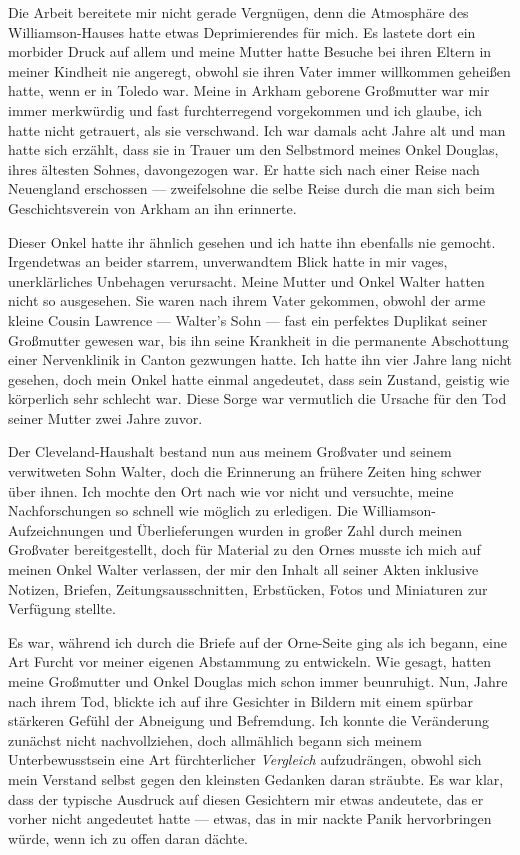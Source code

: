 Die Arbeit bereitete mir nicht gerade Vergnügen, denn die Atmosphäre des Williamson-Hauses hatte etwas Deprimierendes für mich. Es lastete dort ein morbider Druck auf allem und meine Mutter hatte Besuche bei ihren Eltern in meiner Kindheit nie angeregt, obwohl sie ihren Vater immer willkommen geheißen hatte, wenn er in Toledo war. Meine in Arkham geborene Großmutter war mir immer merkwürdig und fast furchterregend vorgekommen und ich glaube, ich hatte nicht getrauert, als sie verschwand. Ich war damals acht Jahre alt und man hatte sich erzählt, dass sie in Trauer um den Selbstmord meines Onkel Douglas, ihres ältesten Sohnes, davongezogen war. Er hatte sich nach einer Reise nach Neuengland erschossen --- zweifelsohne die selbe Reise durch die man sich beim Geschichtsverein von Arkham an ihn erinnerte.

Dieser Onkel hatte ihr ähnlich gesehen und ich hatte ihn ebenfalls nie gemocht. Irgendetwas an beider starrem, unverwandtem Blick hatte in mir vages, unerklärliches Unbehagen verursacht. Meine Mutter und Onkel Walter hatten nicht so ausgesehen. Sie waren nach ihrem Vater  gekommen, obwohl der arme kleine Cousin Lawrence --- Walter's Sohn --- fast ein perfektes Duplikat seiner Großmutter gewesen war, bis ihn seine Krankheit in die permanente Abschottung einer Nervenklinik in Canton gezwungen hatte. Ich hatte ihn vier Jahre lang nicht gesehen, doch mein Onkel hatte einmal angedeutet, dass sein Zustand, geistig wie körperlich sehr schlecht war. Diese Sorge war vermutlich die Ursache für den Tod seiner Mutter zwei Jahre zuvor.

Der Cleveland-Haushalt bestand nun aus meinem Großvater und seinem verwitweten Sohn Walter, doch die Erinnerung an frühere Zeiten hing schwer über ihnen. Ich mochte den Ort nach wie vor nicht und versuchte, meine Nachforschungen so schnell wie möglich zu erledigen. Die Williamson-\-Aufzeichnungen und Überlieferungen wurden in großer Zahl durch meinen Großvater bereitgestellt, doch für Material zu den Ornes musste ich mich auf meinen Onkel Walter verlassen, der mir den Inhalt all seiner Akten inklusive Notizen, Briefen, Zeitungsausschnitten, Erbstücken, Fotos und Miniaturen zur Verfügung stellte.

Es war, während ich durch die Briefe auf der Orne-Seite ging als ich begann, eine Art Furcht vor meiner eigenen Abstammung zu entwickeln. Wie gesagt, hatten meine Großmutter und Onkel Douglas mich schon immer beunruhigt. Nun, Jahre nach ihrem Tod, blickte ich auf ihre Gesichter in Bildern mit einem spürbar stärkeren Gefühl der Abneigung und Befremdung. Ich konnte die Veränderung zunächst nicht nachvollziehen, doch allmählich begann sich meinem  Unterbewusstsein eine Art fürchterlicher \textit{Vergleich}  aufzudrängen, obwohl sich mein Verstand selbst gegen den kleinsten Gedanken daran sträubte. Es war klar, dass der typische Ausdruck auf diesen Gesichtern mir etwas andeutete, das er vorher nicht angedeutet hatte --- etwas, das in mir nackte Panik hervorbringen würde, wenn ich zu offen daran dächte.

